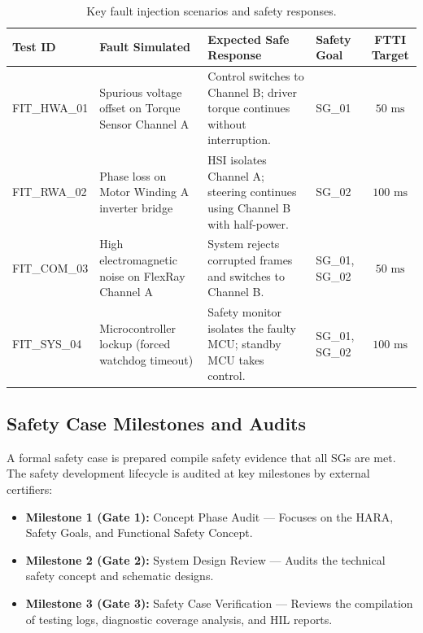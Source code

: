 \begin{table}[H]
    \centering
    \small
    \caption{Key fault injection scenarios and safety responses.}
    \label{tab:fault_injection}
    \begin{tabularx}{\linewidth}{p{1.8cm} X p{3.8cm} l c}
        \toprule
        \textbf{Test ID} & \textbf{Fault Simulated} & \textbf{Expected Safe Response} & \textbf{Safety Goal} & \textbf{FTTI Target} \\
        \midrule
        FIT\_HWA\_01 & Spurious voltage offset on Torque Sensor Channel A & Control switches to Channel B; driver torque continues without interruption. & SG\_01 & \(50\text{~ms}\) \\
        FIT\_RWA\_02 & Phase loss on Motor Winding A inverter bridge & HSI isolates Channel A; steering continues using Channel B with half-power. & SG\_02 & \(100\text{~ms}\) \\
        FIT\_COM\_03 & High electromagnetic noise on FlexRay Channel A & System rejects corrupted frames and switches to Channel B. & SG\_01, SG\_02 & \(50\text{~ms}\) \\
        FIT\_SYS\_04 & Microcontroller lockup (forced watchdog timeout) & Safety monitor isolates the faulty MCU; standby MCU takes control. & SG\_01, SG\_02 & \(100\text{~ms}\) \\
        \bottomrule
    \end{tabularx}
\end{table}

\subsection{Safety Case Milestones and Audits}
A formal safety case is prepared compile safety evidence that all SGs are met. The safety development lifecycle is audited at key milestones by external certifiers:
\begin{itemize}
    \item \textbf{Milestone 1 (Gate 1):} Concept Phase Audit --- Focuses on the HARA, Safety Goals, and Functional Safety Concept.
    \item \textbf{Milestone 2 (Gate 2):} System Design Review --- Audits the technical safety concept and schematic designs.
    \item \textbf{Milestone 3 (Gate 3):} Safety Case Verification --- Reviews the compilation of testing logs, diagnostic coverage analysis, and HIL reports.
\end{itemize}

